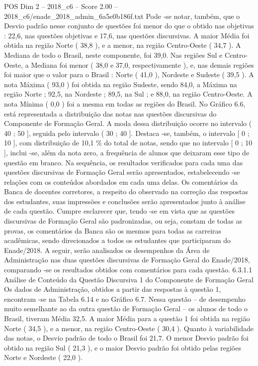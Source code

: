 \begin{textsample}{POS Dim 2 – 2018\_c6 – Score 2.00 – 2018\_c6/enade\_2018\_admin\_6a5e0b186f.txt}
Pode -se notar, também, que o Desvio padrão nesse conjunto de questões foi menor do que o obtido nas objetivas : 22,6, nas questões objetivas e 17,6, nas questões discursivas.
A maior Média foi obtida na região Norte ( 38,8 ), e a menor, na região Centro-Oeste ( 34,7 ).
A Mediana de todo o Brasil, neste componente, foi 39,0.
Nas regiões Sul e Centro-Oeste, a Mediana foi menor ( 38,0 e 37,0, respectivamente ), e, nas demais regiões foi maior que o valor para o Brasil : Norte ( 41,0 ), Nordeste e Sudeste ( 39,5 ).
A nota Máxima ( 93,0 ) foi obtida na região Sudeste, sendo 84,0, a Máxima na região Norte ; 92,5, na Nordeste ; 89,5, na Sul ; e 88,0, na região Centro-Oeste.
A nota Mínima ( 0,0 ) foi a mesma em todas as regiões do Brasil.
No Gráfico 6.6, está representada a distribuição das notas nas questões discursivas do Componente de Formação Geral.
A moda dessa distribuição ocorre no intervalo ( 40 ; 50 ], seguida pelo intervalo ( 30 ; 40 ].
Destaca -se, também, o intervalo [ 0 ; 10 ], com distribuição de 10,1 \% do total de notas, sendo que no intervalo [ 0 ; 10 ], inclui -se, além da nota zero, a frequência de alunos que deixaram esse tipo de questão em branco.
Na sequência, os resultados verificados para cada uma das questões discursivas de Formação Geral serão apresentados, estabelecendo -se relações com os conteúdos abordados em cada uma delas.
Os comentários da Banca de docentes corretores, a respeito do observado na correção das respostas dos estudantes, suas impressões e conclusões serão apresentados junto à análise de cada questão.
Cumpre esclarecer que, tendo -se em vista que as questões discursivas de Formação Geral são padronizadas, ou seja, constam de todas as provas, os comentários da Banca são os mesmos para todas as carreiras acadêmicas, sendo direcionados a todos os estudantes que participaram do Enade/2018.
A seguir, serão analisados os desempenhos da Área de Administração nas duas questões discursivas de Formação Geral do Enade/2018, comparando -se os resultados obtidos com comentários para cada questão. 6.3.1.1 Análise de Conteúdo da Questão Discursiva 1 do Componente de Formação Geral Os dados de Administração, obtidos a partir das respostas à questão 1, encontram -se na Tabela 6.14 e no Gráfico 6.7.
Nessa questão – de desempenho muito semelhante ao da outra questão de Formação Geral – os alunos de todo o Brasil, tiveram Média 32,5.
A maior Média para a questão 1 foi obtida na região Norte ( 34,5 ), e a menor, na região Centro-Oeste ( 30,4 ).
Quanto à variabilidade das notas, o Desvio padrão de todo o Brasil foi 21,7.
O menor Desvio padrão foi obtido na região Sul ( 21,3 ), e o maior Desvio padrão foi obtido pelas regiões Norte e Nordeste ( 22,0 ).

\end{textsample}
